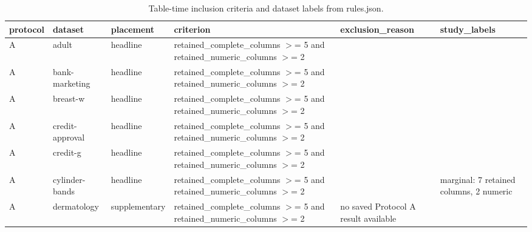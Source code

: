 \begin{table}[ht]
\centering
\caption{Table-time inclusion criteria and dataset labels from rules.json.}
\label{tab:rules_summary}
\begin{tabular}{llllll}
\hline
 protocol            & dataset              & placement                             & criterion                                                        & exclusion\_reason                         & study\_labels                                                          \\
\hline
 A                   & adult                & headline                              & retained\_complete\_columns \ensuremath{>}= 5 and retained\_numeric\_columns \ensuremath{>}= 2 &                                          &                                                                       \\
 A                   & bank-marketing       & headline                              & retained\_complete\_columns \ensuremath{>}= 5 and retained\_numeric\_columns \ensuremath{>}= 2 &                                          &                                                                       \\
 A                   & breast-w             & headline                              & retained\_complete\_columns \ensuremath{>}= 5 and retained\_numeric\_columns \ensuremath{>}= 2 &                                          &                                                                       \\
 A                   & credit-approval      & headline                              & retained\_complete\_columns \ensuremath{>}= 5 and retained\_numeric\_columns \ensuremath{>}= 2 &                                          &                                                                       \\
 A                   & credit-g             & headline                              & retained\_complete\_columns \ensuremath{>}= 5 and retained\_numeric\_columns \ensuremath{>}= 2 &                                          &                                                                       \\
 A                   & cylinder-bands       & headline                              & retained\_complete\_columns \ensuremath{>}= 5 and retained\_numeric\_columns \ensuremath{>}= 2 &                                          & marginal: 7 retained columns, 2 numeric                               \\
 A                   & dermatology          & supplementary                         & retained\_complete\_columns \ensuremath{>}= 5 and retained\_numeric\_columns \ensuremath{>}= 2 & no saved Protocol A result available     &                                                                       \\

\end{tabular}
\end{table}
